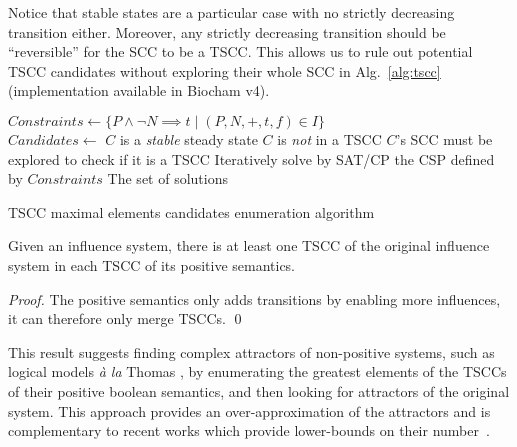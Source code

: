 \documentclass{llncs}
\begin{document}
Notice that stable states are a particular case with no strictly decreasing
transition either.
Moreover, any strictly decreasing transition should be
``reversible'' for the SCC to be a TSCC. This allows us to rule out potential
TSCC candidates without exploring their whole SCC in Alg.~\ref{alg:tscc}
(implementation available in Biocham v4).

\begin{algorithm}[htb]
\begin{algorithmic}
   \State $Constraints\gets\{P\wedge\neg N\implies t\mid (P, N, +, t, f)\in
      I\}$\\
   \State $Candidates\gets$
      \State $C$ is a \emph{stable} steady state
      \State $C$ is \emph{not} in a TSCC
      \Else
      \State $C$'s SCC must be explored to check if it is a TSCC
      \EndIf
   \EndFor
   \EndProcedure
      \State Iteratively solve by SAT/CP the CSP defined by $Constraints$
      \State \Return The set of solutions
   \EndFunction
\end{algorithmic}
\caption{TSCC maximal elements candidates enumeration algorithm} 
\label{alg:tscc}
\end{algorithm}

\begin{proposition}

   Given an influence system, there is at least one TSCC of the original
   influence system in each TSCC of its positive semantics.

\end{proposition}
\begin{proof}

   The positive semantics only adds transitions by enabling more influences,
   it can therefore only merge TSCCs. \qed

\end{proof}

This result suggests finding complex attractors of non-positive systems,
such as logical models \emph{\`a la} Thomas \cite{RRT08aam,Ruet16mfcs}, by enumerating
the greatest elements of the TSCCs of their positive boolean semantics, and then looking for
attractors of the original system.
This approach provides an over-approximation of the attractors
and is complementary to recent works which provide lower-bounds on their
number~\cite{KBS14acri}.
\end{document}

